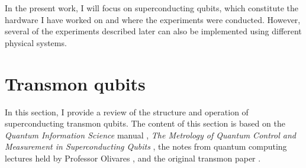 In the present work, I will focus on superconducting qubits, which constitute the hardware I have worked on and where the experiments were conducted. 
However, several of the experiments described later can also be implemented using different physical systems.

\section{Transmon qubits}\label{sec:cQED}
In this section, I provide a review of the structure and operation of superconducting transmon qubits. 
The content of this section is based on the \textit{Quantum Information Science} manual \cite{manenti_quantum_2023}, \textit{The Metrology of Quantum Control and Measurement in Superconducting Qubits} \cite{Chen2018}, the notes from quantum computing lectures held by Professor Olivares \cite{Olivares2021}, and the original transmon paper \cite{TransmonPaper}.


